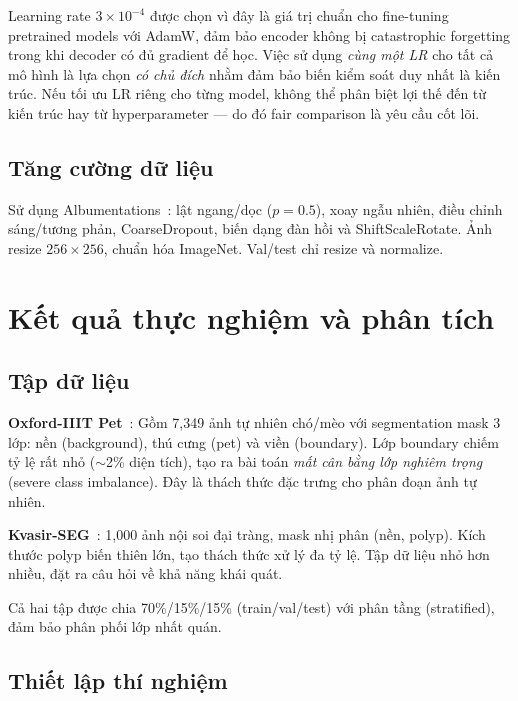 \documentclass{article}
\begin{document}
Learning rate $3{\times}10^{-4}$ được chọn vì đây là giá trị chuẩn cho fine-tuning pretrained models với AdamW, đảm bảo encoder không bị catastrophic forgetting trong khi decoder có đủ gradient để học.
Việc sử dụng \emph{cùng một LR} cho tất cả mô hình là lựa chọn \emph{có chủ đích} nhằm đảm bảo biến kiểm soát duy nhất là kiến trúc.
Nếu tối ưu LR riêng cho từng model, không thể phân biệt lợi thế đến từ kiến trúc hay từ hyperparameter --- do đó fair comparison là yêu cầu cốt lõi.

\subsection{Tăng cường dữ liệu}
\label{subsec:augmentation}

Sử dụng Albumentations~\cite{buslaev2020albumentations}:
lật ngang/dọc ($p{=}0.5$), xoay ngẫu nhiên,
điều chỉnh sáng/tương phản, CoarseDropout,
biến dạng đàn hồi và ShiftScaleRotate.
Ảnh resize $256{\times}256$, chuẩn hóa ImageNet.
Val/test chỉ resize và normalize.

\section{Kết quả thực nghiệm và phân tích}
\label{sec:results_analysis}

\subsection{Tập dữ liệu}
\label{subsec:datasets}

\textbf{Oxford-IIIT Pet}~\cite{parkhi2012cats}: Gồm 7{,}349 ảnh tự nhiên chó/mèo với segmentation mask 3 lớp: nền (background), thú cưng (pet) và viền (boundary).
Lớp boundary chiếm tỷ lệ rất nhỏ ($\sim$2\% diện tích), tạo ra bài toán \emph{mất cân bằng lớp nghiêm trọng} (severe class imbalance).
Đây là thách thức đặc trưng cho phân đoạn ảnh tự nhiên.

\textbf{Kvasir-SEG}~\cite{jha2020kvasir}: 1{,}000 ảnh nội soi đại tràng, mask nhị phân (nền, polyp).
Kích thước polyp biến thiên lớn, tạo thách thức xử lý đa tỷ lệ.
Tập dữ liệu nhỏ hơn nhiều, đặt ra câu hỏi về khả năng khái quát.

Cả hai tập được chia 70\%/15\%/15\% (train/val/test) với phân tầng (stratified), đảm bảo phân phối lớp nhất quán.

\subsection{Thiết lập thí nghiệm}
\label{subsec:setup}
\end{document}
